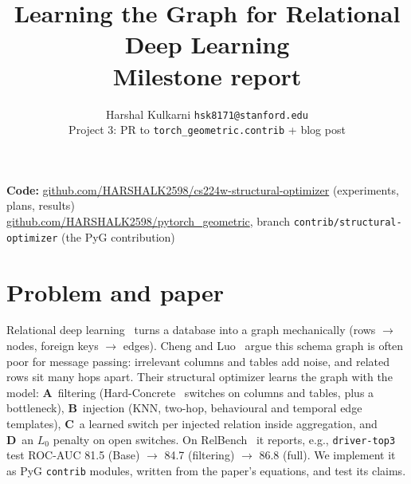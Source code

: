 \documentclass{article}
\title{Learning the Graph for Relational Deep Learning\\[2pt]\large Milestone report}
\author{%
  Harshal Kulkarni \quad \texttt{hsk8171@stanford.edu} \\
  Project 3: PR to \texttt{torch\_geometric.contrib} + blog post
}
\newcommand{\code}[1]{\texttt{#1}}
\begin{document}
\maketitle
\vspace{-2.8em}
\begin{center}
\small
\textbf{Code:} \href{https://github.com/HARSHALK2598/cs224w-structural-optimizer}{github.com/HARSHALK2598/cs224w-structural-optimizer} (experiments, plans, results)\\
\href{https://github.com/HARSHALK2598/pytorch_geometric/tree/contrib/structural-optimizer}{github.com/HARSHALK2598/pytorch\_geometric}, branch \code{contrib/structural-optimizer} (the PyG contribution)
\end{center}
\vspace{-0.6em}

\section{Problem and paper}
\vspace{-0.4em}
Relational deep learning~\cite{fey2024rdl} turns a database into a graph mechanically (rows $\to$
nodes, foreign keys $\to$ edges). Cheng and Luo~\cite{cheng2026desired} argue this schema graph is
often poor for message passing: irrelevant columns and tables add noise, and related rows sit many
hops apart. Their structural optimizer learns the graph with the model: \textbf{A}~filtering
(Hard-Concrete~\cite{louizos2018l0} switches on columns and tables, plus a bottleneck),
\textbf{B}~injection (KNN, two-hop, behavioural and temporal edge templates), \textbf{C}~a learned
switch per injected relation inside aggregation, and \textbf{D}~an $L_0$ penalty on open switches.
On RelBench~\cite{robinson2024relbench} it reports, e.g., \code{driver-top3} test ROC-AUC 81.5 (Base)
$\to$ 84.7 (filtering) $\to$ 86.8 (full). We implement it as PyG \code{contrib} modules, written from
the paper's equations, and test its claims.
\end{document}
